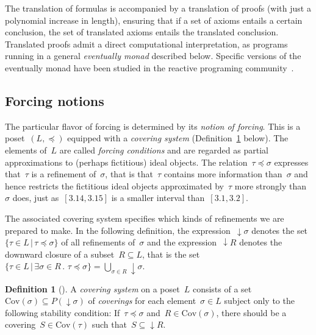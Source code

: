 \documentclass[com,11pt,crcready]{iosart2x}
\theoremstyle{definition}
\newtheorem{definition}{Definition}[section]
\theoremstyle{plain}
\theoremstyle{remark}
\newcommand{\?}{\,{:}\,}
\newcommand{\Cov}{\mathrm{Cov}}
\renewcommand{\_}{\mathpunct{.}\,}
\begin{document}
The translation of formulas is accompanied by a translation of proofs (with
just a polynomial increase in length), ensuring that if a set of axioms
entails a certain conclusion, the set of translated axioms entails the
translated conclusion. Translated proofs admit a direct computational
interpretation, as programs running in a general \emph{eventually monad} described
below. Specific versions of the eventually monad have been studied in the
reactive programing
community~\cite{paykin-krishnaswami-zdancewic:event,cave-ferreira-panangaden-pientka:frp}.


\subsection{Forcing notions}\label{sect:forcing-notions} The particular flavor of forcing is determined
by its \emph{notion of forcing}. This is a poset~$(L,{\preccurlyeq})$ equipped with a
\emph{covering system} (Definition~\ref{defn:covering-system} below). The
elements of~$L$ are called \emph{forcing conditions} and are regarded
as partial approximations to (perhaps fictitious) ideal objects. The
relation~$\tau \preccurlyeq \sigma$ expresses that~$\tau$ is a
refinement of~$\sigma$, that is that~$\tau$ contains more information
than~$\sigma$ and hence restricts the fictitious ideal objects
approximated by~$\tau$ more strongly than~$\sigma$ does, just as~$[3.14, 3.15]$ is a smaller
interval than~$[3.1, 3.2]$.

The associated covering system specifies which kinds of refinements
we are prepared to make. In the following definition, the
expression~${\downarrow}\sigma$ denotes the set~$\{ \tau \in L \,|\, \tau
\preccurlyeq \sigma \}$ of all refinements of~$\sigma$ and the
expression~${\downarrow}R$ denotes the downward closure of a subset~$R \subseteq L$, that is the
set~$\{ \tau \in L \,|\, \exists \sigma \in R\_ \tau \preccurlyeq \sigma \} =
\bigcup_{\sigma \in R} {\downarrow}\sigma$.

\begin{definition}[{\cite[p.~24]{joyal-tierney:grothendieck}}]\label{defn:covering-system}A \emph{covering system} on a
poset~$L$ consists of a set~$\Cov(\sigma) \subseteq P({\downarrow}\sigma)$
of \emph{coverings} for each element~$\sigma \in L$ subject only to the
following stability condition:
If~$\tau \preccurlyeq \sigma$ and~$R \in \Cov(\sigma)$, there should be a
covering~$S \in \Cov(\tau)$ such that~$S \subseteq {\downarrow}R$.
\end{definition}
\end{document}
